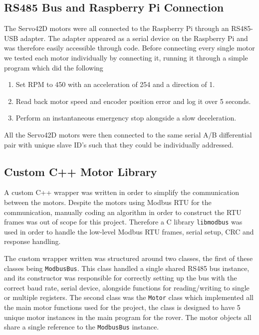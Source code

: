 \subsection{RS485 Bus and Raspberry Pi Connection}
The Servo42D motors were all connected to the Raspberry Pi through an RS485-USB adapter. The adapter appeared as a serial device on the Raspberry Pi and was therefore easily accessible through code.
Before connecting every single motor we tested each motor individually by connecting it, running it through a simple program which did the following

\begin{enumerate}
    \item Set RPM to 450 with an acceleration of 254 and a direction of 1.
    \item Read back motor speed and encoder position error and log it over 5 seconds.
    \item Perform an instantaneous emergency stop alongside a slow deceleration.
\end{enumerate}

All the Servo42D motors were then connected to the same serial A/B differential pair with unique slave ID's such that they could be individually addressed.

\subsection{Custom C++ Motor Library}
A custom C++ wrapper was written in order to simplify the communication between the motors. Despite the motors using Modbus RTU for the communication, manually coding an algorithm in order to construct the RTU frames was out of scope for this project.
Therefore a C library \texttt{libmodbus} was used in order to handle the low-level Modbus RTU frames, serial setup, CRC and response handling. 

The custom wrapper written was structured around two classes, the first of these classes being \texttt{ModbusBus}. 
This class handled a single shared RS485 bus instance, and its constructor was responsible for correctly setting up the bus with the correct baud rate, serial device, alongside functions for reading/writing to single or multiple registers.
The second class was the \texttt{Motor} class which implemented all the main motor functions used for the project, the class is designed to have 5 unique motor instances in the main program for the rover. The motor objects all share a single reference to the \texttt{ModbusBus} instance.

